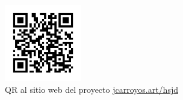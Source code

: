 \documentclass[Times,12pt,oneside,openany,print,index]{report}
\begin{document}
{}
\printbibliography[title={Bibliografía}, nottype=online]

{}
\printbibliography[title={Videografía}, type=online]

\chapter*{}

\begin{figure}[h!]
    \thispagestyle{empty}
    \captionsetup{labelformat=empty}
    \centering
    \includegraphics[width=0.3\textwidth]{qr_jcarroyos_research.png}
    \caption{QR al sitio web del proyecto \href{https://jcarroyos.art/docs/research/hsjd}{jcarroyos.art/hsjd}}
\end{figure}
\end{document}
